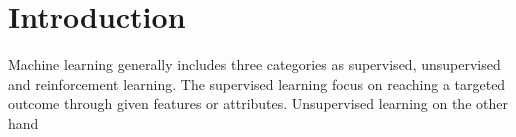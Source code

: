 \section{Introduction}

Machine learning generally includes three categories as supervised, unsupervised and reinforcement learning. The supervised learning focus on reaching a targeted outcome through given features or attributes. Unsupervised learning on the other hand
